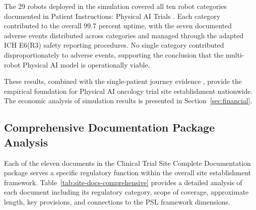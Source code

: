 \clearpage

The 29 robots deployed in the simulation covered all ten robot categories
documented in Patient Instructions: Physical AI Trials
\cite{patient-instructions-paper}. Each category contributed to the overall
99.7 percent uptime, with the seven documented adverse events distributed
across categories and managed through the adapted ICH E6(R3) safety reporting
procedures. No single category contributed disproportionately to adverse
events, supporting the conclusion that the multi-robot Physical AI model is
operationally viable.

These results, combined with the single-patient journey evidence
\cite{patient-journey-paper}, provide the empirical foundation for Physical AI
oncology trial site establishment nationwide. The economic analysis of
simulation results is presented in Section~\ref{sec:financial}.

\subsection{Comprehensive Documentation Package Analysis}
\label{subsec:site-docs-comprehensive}

Each of the eleven documents in the Clinical Trial Site Complete Documentation
package serves a specific regulatory function within the overall site
establishment framework. Table~\ref{tab:site-docs-comprehensive} provides a
detailed analysis of each document including its regulatory category, scope of
coverage, approximate length, key provisions, and connections to the PSL
framework dimensions.

